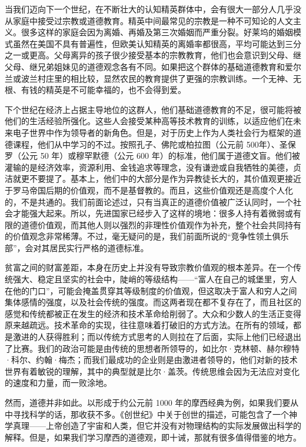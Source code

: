 当我们迈向下一个世纪，在不断壮大的认知精英群体中，会有很大一部分人几乎没从家庭中接受过宗教或道德教育。精英中间最常见的宗教是一种不可知论的人文主义。很多这样的家庭会因为离婚、再婚及第三次婚姻而严重分裂。好莱坞的婚姻模式虽然在美国不具有普遍性，但欧美认知精英的离婚率都很高，平均可能达到三分之一或更高。父母离异的孩子很少接受基本的宗教教育，他们也会意识到父母、继父母、继兄弟姐妹见的道德观念各有不同。如果把这个群体的基础道德教育和爱尔兰或波兰村庄里的相比较，显然农民的教育提供了更强的宗教训练。一个无神、无根、有钱的精英是不可能幸福的，也不会得到爱。

下个世纪在经济上占据主导地位的这群人，他们基础道德教育的不足，很可能将被他们的生活经验所强化。这些人会接受某种高等技术教育的训练，以适应他们在未来电子世界中作为领导者的新角色。但是，对于历史上作为人类社会行为框架的道德课程，他们从中学习的不过。按照孔子、佛陀或柏拉图（公元前 500年）、圣保罗（公元 50 年）或穆罕默德（公元 600 年）的标准，他们属于道德文盲。他们被灌输的是经济效率，资源利用、金钱追求等理念，没有谦逊或自我牺牲的美德，贞洁就更不要提了。基本上，他们中的大部分是作为异教徒长大的，其价值观更接近于罗马帝国后期的价值观，而不是基督教的。而且，这些价值观还是高度个人化的，不是共通的。我们前面论述过，只有当真正的道德价值被广泛认同时，一个社会才能强大起来。所以，先进国家已经步入了这样的境地：很多人持有着微弱或有限的道德价值观，而其他人则以强烈的非理性价值观作为补充，整个社会共同持有的价值观念非常稀薄。不过，毫无疑问的是，我们前面所说的“竞争性领土俱乐部”，会对其居民实行严格的道德标准。

贫富之间的财富差距，本身在历史上并没有导致宗教价值观的根本差异。在一个传统强大、稳定且坚实的社会中，陡峭的等级结构——“富人在自己的城堡里，穷人在他的门口”，可能会掩盖贯穿其等级制度的价值观，但这取决于富人和穷人之间集体感情的强度，以及社会传统的强度。而这两者现在都不复存在了，而且社区的感觉和传统都被正在发生的经济和技术革命给削弱了。大众和少数人的生活正变得原来越疏远。技术革命的实现，往往意味着打破旧的方式方法。在所有的领域，都是激进的人获得胜利；而以传统方式思考的人则拉在了后面，实际上他们已经退出了比赛。我们的政治可能是由传统的思想者所领导的，如比尔·克林顿、赫尔穆特·科尔、约翰·梅杰；而我们最成功的企业则是由激进者领导的，他们对新的技术世界有着敏锐的理解，其中的典型就是比尔·盖茨。传统思维会因为无法应对变化的速度和力量，而一败涂地。

然而，道德并非如此。以形成于约公元前 1000 年的摩西经典为例，如果我们要从中寻找科学的话，那收获不多。《创世纪》中关于创世的描述，可能包含了一个神学真理——上帝创造了宇宙和人类，但它并没有对物理结构的实际发展做出科学的解释。但是，如果我们学习摩西的道德观，即十诫，那就有很多值得借鉴的地方。


